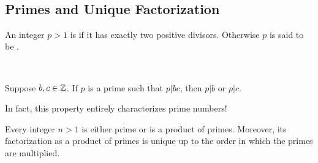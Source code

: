 \documentclass[11pt,fleqn,dvipsnames,usenames]{article}
\begin{document}
\begin{example*}~
\vspace{2cm}

\end{example*}

\subsection{Primes and Unique Factorization}

\begin{definition}
An integer $p > 1$ is  if it has exactly two positive divisors.  Otherwise $p$ is said to be .
\end{definition}

\begin{example*}~
\vspace{1cm}

\end{example*}

\begin{theorem*}\label{euclidslemma}
Suppose $b,c\in\mathbb{Z}$.  If $p$ is a prime such that $p|bc$, then $p|b$ or $p|c$.
\end{theorem*}
\vsp

\begin{remark}
In fact, this property entirely characterizes prime numbers!
\end{remark}
\newpage

\begin{theorem}
Every integer $n > 1$ is either prime or is a product of primes.  Moreover, its factorization as a product of primes is unique up to the order in which the primes are multiplied.
\end{theorem}
%
\begin{examples*}~
\vspace{5cm}

\end{examples*}
\end{document}
